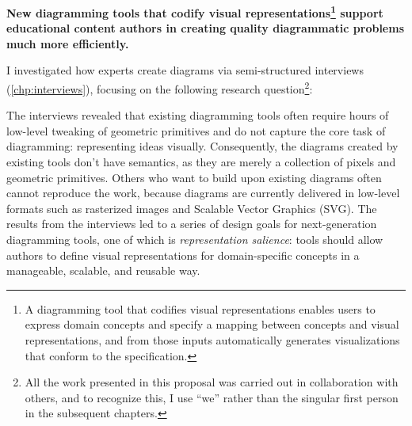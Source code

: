 \vspace{1em}
\begin{mdframed}
\begin{center} 
\parbox{0.95\linewidth}{ 
\renewcommand{\thempfootnote}{\fnsymbol{footnote}}
\textbf{New diagramming tools that codify visual representations\footnote{A diagramming tool that codifies visual representations enables users to express domain concepts and specify a mapping between concepts and visual representations, and from those inputs automatically generates visualizations that conform to the specification.} support educational content authors in creating quality diagrammatic problems much more efficiently.}
}
\end{center}
\end{mdframed}
\vspace{1em}

\renewcommand*{\thefootnote}{\arabic{footnote}}




I investigated how experts create diagrams via semi-structured interviews (\cref{chp:interviews}), focusing on the following research question\footnote{All the work presented in this proposal was carried out in collaboration with others, and to recognize this, I use ``we'' rather than the singular first person in the subsequent chapters.}:

\label{rq:diagrammer}

\noindent The interviews revealed that existing diagramming tools often require hours of low-level tweaking of geometric primitives and do not capture the core task of diagramming: representing ideas visually. Consequently, the diagrams created by existing tools don't have semantics, as they are merely a collection of pixels and geometric primitives. Others who want to build upon existing diagrams often cannot reproduce the work, because diagrams are currently delivered in low-level formats such as rasterized images and Scalable Vector Graphics (SVG). The results from the interviews led to a series of design goals for next-generation diagramming tools, one of which is \textit{representation salience}: tools should allow authors to define visual representations for domain-specific concepts in a manageable, scalable, and reusable way. 

